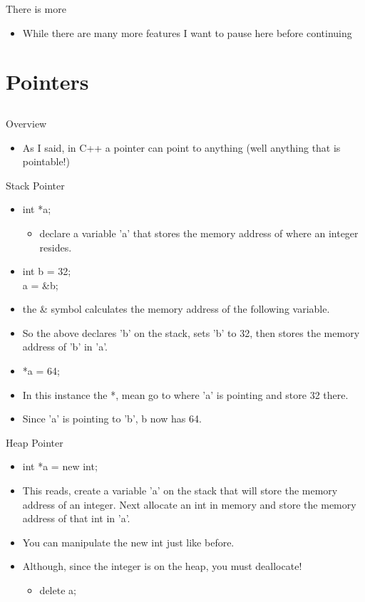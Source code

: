 \documentclass{beamer}
\begin{document}
\begin{frame}{There is more}
\begin{itemize}
\item While there are many more features I want to pause here before continuing
\end{itemize}
\end{frame}

\section{Pointers}
\subsection{}

\begin{frame}{Overview}
\begin{itemize}
\item As I said, in C++ a pointer can point to anything (well anything that is pointable!)
\end{itemize}
\end{frame}

\begin{frame}{Stack Pointer}
\begin{itemize}
\item int *a;
\begin{itemize}
\item declare a variable 'a' that stores the memory address of where an integer resides.
\end{itemize}
\item int b = 32; \\
a = \&b;
\item the \& symbol calculates the memory address of the following variable.
\item So the above declares 'b' on the stack, sets 'b' to 32, then stores the memory address of 'b' in 'a'.
\item *a = 64;
\item In this instance the *, mean go to where 'a' is pointing and store 32 there.
\item Since 'a' is pointing to 'b', b now has 64.
\end{itemize}
\end{frame}

\begin{frame}{Heap Pointer}
\begin{itemize}
\item int *a = new int;
\item This reads, create a variable 'a' on the stack that will store the memory address of an integer.  Next allocate an int in memory and store the memory address of that int in 'a'.
\item You can manipulate the new int just like before.
\item Although, since the integer is on the heap, you must deallocate!
\begin{itemize}
\item delete a;
\end{itemize}
\end{itemize}
\end{frame}
\end{document}
